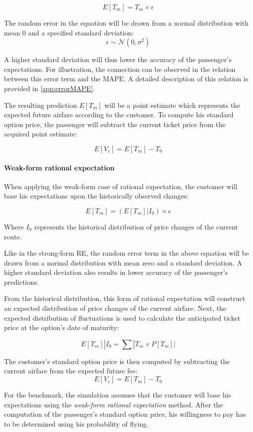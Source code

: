$$ E[T_m] = T_m \times \epsilon$$

The random error in the equation will be drawn from a normal distribution with mean 0 and a specified standard deviation:
$$ \epsilon \sim \mathcal{N} (0, \sigma^2) $$

A higher standard deviation will thus lower the accuracy of the passenger's expectations. For illustration, the connection can be observed in the relation between this error term and the $\mbox{MAPE}$. A detailed description of this relation is provided in \autoref{app:errorMAPE}.

The resulting prediction $E[T_m]$ will be a point estimate which represents the expected future airfare according to the customer. To compute his standard option price, the passenger will subtract the current ticket price from the acquired point estimate:

$$ E[V_c] = E[T_m] - T_0$$


\paragraph{Weak-form rational expectation}
When applying the weak-form case of rational expectation, the customer will base his expectations upon the historically observed changes:

$$ E[T_m] = (E[T_m] | I_0) \times \epsilon $$

Where $I_0$ represents the historical distribution of price changes of the current route.

Like in the strong-form RE, the random error term in the above equation will be drawn from a normal distribution with mean zero and a standard deviation. A higher standard deviation also results in lower accuracy of the passenger's predictions.

From the historical distribution, this form of rational expectation will construct an expected distribution of price changes of the current airfare. Next, the expected distribution of fluctuations is used to calculate the anticipated ticket price at the option's date of maturity:

$$ E[T_m] | I_0 = \sum |T_m \times P[T_m]| $$

The customer's standard option price is then computed by subtracting the current airfare from the expected future fee:
$$ E[V_c] = E[T_m] - T_0 $$

For the benchmark, the simulation assumes that the customer will base his expectations using the \emph{weak-form rational expectation} method. After the computation of the passenger's standard option price, his willingness to pay has to be determined using his probability of flying.

